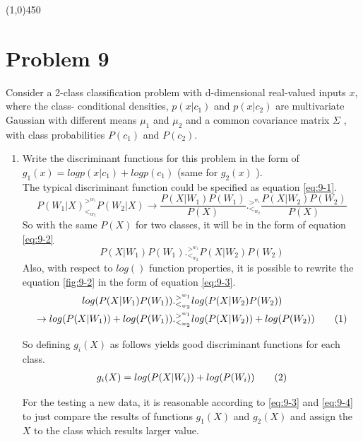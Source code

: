 \documentclass[12pt]{article}
\newcommand\numberthis{\addtocounter{equation}{1}\tag{\theequation}}
\newcommand{\gl}{^{>^{w_1}}_{<_{w_2}}}
\begin{document}
\begin{center}
\line(1,0){450}
\end{center}


\section{Problem 9}
Consider a 2-class classification problem with d-dimensional real-valued inputs $x$, where the class-
conditional densities, $p ( x | c_1 )$ and $p ( x | c_2 )$ are multivariate Gaussian with different means $\mu_1$ and $\mu_2$ and a common covariance matrix $\Sigma$ , with class probabilities $P(c_1 )$ and $P(c_2 )$.
\begin{enumerate}
\item Write the discriminant functions for this problem in the form of $g_1 ( x ) = log p ( x | c_1 ) + log p ( c_1 )$ (same for $g_2 ( x )$ ). \\

The typical discriminant function could be specified as equation \eqref{eq:9-1}. 
\begin{equation}
P(W_1|X)\gl P(W_2|X) \rightarrow \frac{P(X|W_1)P(W_1)}{P(X)} .\gl \frac{P(X|W_2)P(W_2)}{P(X)} 
\label{eq:9-1}
\end{equation}
So with the same $P(X)$ for two classes, it will be in the form of equation \eqref{eq:9-2}
\begin{equation}
P(X|W_1)P(W_1) .\gl P(X|W_2)P(W_2)
\label{eq:9-2}
\end{equation}
Also, with respect to $log()$ function properties, it is possible to rewrite the equation \eqref{fig:9-2} in the form of equation \eqref{eq:9-3}.
\begin{align*}
log(P(X|W_1)P(W_1)) &.\gl log(P(X|W_2)P(W_2)) \\
\rightarrow log(P(X|W_1)) + log(P(W_1)) &.\gl  log(P(X|W_2)) + log(P(W_2))
\numberthis
\label{eq:9-3}
\end{align*}

So defining $g_i(X)$ as follows yields good discriminant functions for each class.
\begin{align*}
g_i(X) =  log(P(X|W_i)) + log(P(W_i)) 
\numberthis
\label{eq:9-4}
\end{align*}

For the testing a new data, it is reasonable according to \eqref{eq:9-3} and \eqref{eq:9-4} to just compare the results of functions $g_1(X)$ and $g_2(X)$ and assign the $X$ to the class which results larger value.


\end{enumerate}
\end{document}
